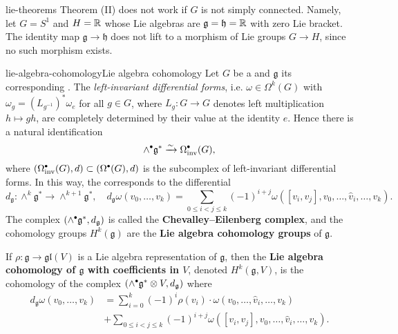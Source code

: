 \begin{example}{lie-theorems}
    Theorem (II) does not work if $G$ is not simply connected. Namely, let $G = S^1$ and $H = \mathbb{R}$ whose Lie algebras are $\mathfrak{g} = \mathfrak{h} = \mathbb{R}$ with zero Lie bracket. The identity map $\mathfrak{g} \to \mathfrak{h}$ does not lift to a morphism of Lie groups $G \to H$, since no such morphism exists.
\end{example}

\begin{topic}{lie-algebra-cohomology}{Lie algebra cohomology}
    Let $G$ be a  and $\mathfrak{g}$ its corresponding . The \textit{left-invariant differential forms}, i.e.  $\omega \in \Omega^k(G)$ with $\omega_g = (L_{g^{-1}})^* \omega_e$ for all $g \in G$, where $L_g \colon G \to G$ denotes left multiplication $h \mapsto gh$, are completely determined by their value at the identity $e$. Hence there is a natural identification
    \[ \wedge^\bdot \mathfrak{g}^* \xrightarrow{\sim} \Omega^\bdot_\textup{inv}(G), \]
    where $(\Omega^\bdot_\textup{inv}(G), d) \subset (\Omega^\bdot(G), d)$ is the subcomplex of left-invariant differential forms. In this way, the  corresponds to the differential
    \[ d_\mathfrak{g} \colon \wedge^k \mathfrak{g}^* \to \wedge^{k + 1} \mathfrak{g}^*, \quad d_\mathfrak{g} \omega(v_0, \ldots, v_k) = \sum_{0 \le i < j \le k} (-1)^{i + j} \omega([v_i, v_j], v_0, \ldots, \hat{v}_i, \ldots, v_k) . \]
    The complex $(\wedge^\bdot \mathfrak{g}^*, d_\mathfrak{g})$ is called the \textbf{Chevalley--Eilenberg complex}, and the cohomology groups $H^k(\mathfrak{g})$ are the \textbf{Lie algebra cohomology groups} of $\mathfrak{g}$.
    
    If $\rho \colon \mathfrak{g} \to \mathfrak{gl}(V)$ is a Lie algebra representation of $\mathfrak{g}$, then the \textbf{Lie algebra cohomology of $\mathfrak{g}$ with coefficients in $V$}, denoted $H^k(\mathfrak{g}, V)$, is the cohomology of the complex $(\wedge^\bdot \mathfrak{g}^* \otimes V, d_\mathfrak{g})$ where
    \[ \begin{aligned}
        d_\mathfrak{g} \omega(v_0, \ldots, v_k) &= \sum_{i = 0}^{k} (-1)^i \rho(v_i) \cdot \omega(v_0, \ldots, \hat{v}_i, \ldots, v_k) \\ &+ \sum_{0 \le i < j \le k} (-1)^{i + j} \omega([v_i, v_j], v_0, \ldots, \hat{v}_i, \ldots, v_k) .
    \end{aligned} \]
\end{topic}

